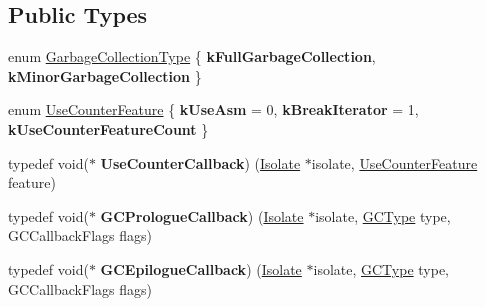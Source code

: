 \subsection*{Public Types}
\begin{DoxyCompactItemize}
\item 
enum \hyperlink{classv8_1_1_isolate_a5ae00cc99d8aca148c6f5f9698c432c9}{Garbage\+Collection\+Type} \{ {\bfseries k\+Full\+Garbage\+Collection}, 
{\bfseries k\+Minor\+Garbage\+Collection}
 \}
\item 
enum \hyperlink{classv8_1_1_isolate_aed6909379c3f2820cb3084710b73385d}{Use\+Counter\+Feature} \{ {\bfseries k\+Use\+Asm} = 0, 
{\bfseries k\+Break\+Iterator} = 1, 
{\bfseries k\+Use\+Counter\+Feature\+Count}
 \}
\item 
\hypertarget{classv8_1_1_isolate_a7537ead98ee88eec2976348ba992935c}{}typedef void($\ast$ {\bfseries Use\+Counter\+Callback}) (\hyperlink{classv8_1_1_isolate}{Isolate} $\ast$isolate, \hyperlink{classv8_1_1_isolate_aed6909379c3f2820cb3084710b73385d}{Use\+Counter\+Feature} feature)\label{classv8_1_1_isolate_a7537ead98ee88eec2976348ba992935c}

\item 
\hypertarget{classv8_1_1_isolate_ab14f02c51e012f839e6cc184ede4814a}{}typedef void($\ast$ {\bfseries G\+C\+Prologue\+Callback}) (\hyperlink{classv8_1_1_isolate}{Isolate} $\ast$isolate, \hyperlink{namespacev8_ac109d6f27e0c0f9ef4e98bcf7a806cf2}{G\+C\+Type} type, G\+C\+Callback\+Flags flags)\label{classv8_1_1_isolate_ab14f02c51e012f839e6cc184ede4814a}

\item 
\hypertarget{classv8_1_1_isolate_a3e7351067af07d2a56c57d855fada4bb}{}typedef void($\ast$ {\bfseries G\+C\+Epilogue\+Callback}) (\hyperlink{classv8_1_1_isolate}{Isolate} $\ast$isolate, \hyperlink{namespacev8_ac109d6f27e0c0f9ef4e98bcf7a806cf2}{G\+C\+Type} type, G\+C\+Callback\+Flags flags)\label{classv8_1_1_isolate_a3e7351067af07d2a56c57d855fada4bb}

\end{DoxyCompactItemize}
